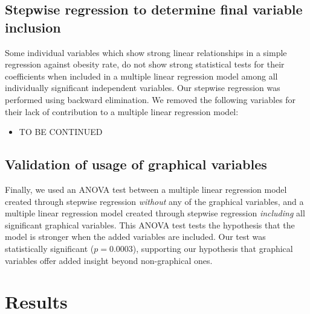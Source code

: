 \documentclass[oneside,12pt]{report}
\begin{document}
\section*{Stepwise regression to determine final variable inclusion}

Some individual variables which show strong linear relationships in a simple regression against obesity rate, do not show strong statistical tests for their coefficients when included in a multiple linear regression model among all individually significant independent variables. Our stepwise regression was performed using backward elimination. We removed the following variables for their lack of contribution to a multiple linear regression model:
\begin{itemize}
\item TO BE CONTINUED
\end{itemize}

\section*{Validation of usage of graphical variables}

Finally, we used an ANOVA test between a multiple linear regression model created through stepwise regression \emph{without} any of the graphical variables, and a multiple linear regression model created through stepwise regression \emph{including} all significant graphical variables. This ANOVA test tests the hypothesis that the model is stronger when the added variables are included. Our test was statistically significant (\begin{math}p=0.0003\end{math}), supporting our hypothesis that graphical variables offer added insight beyond non-graphical ones.

\chapter{Results}
\end{document}
